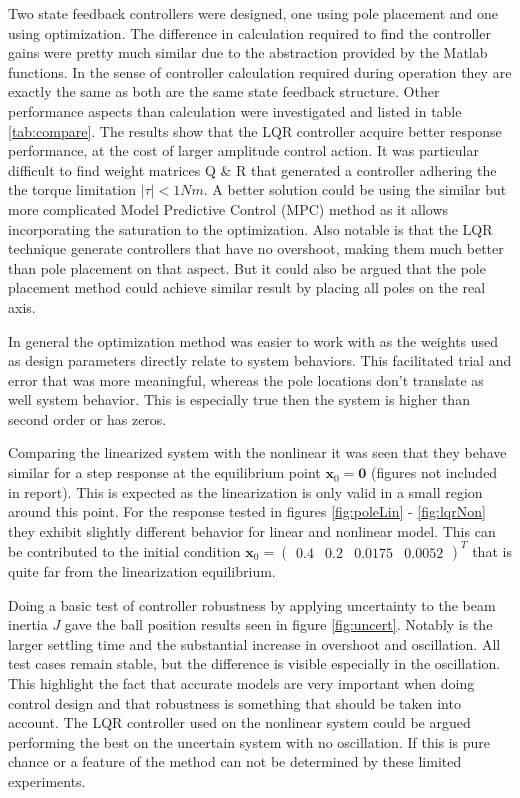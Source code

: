 \documentclass[a4paper, titlepage]{article}
\begin{document}
Two state feedback controllers were designed, one using pole placement and one using optimization.
The difference in calculation required to find the controller gains were pretty much similar due to the abstraction provided by the Matlab functions.
In the sense of controller calculation required during operation they are exactly the same as both are the same state feedback structure.
Other performance aspects than calculation were investigated and listed in table \ref{tab:compare}.
The results show that the LQR controller acquire better response performance, at the cost of larger amplitude control action.
It was particular difficult to find weight matrices Q \& R that generated a controller adhering the the torque limitation $|\tau| < 1Nm$.
A better solution could be using the similar but more complicated Model Predictive Control (MPC) method as it allows incorporating the saturation to the optimization.
Also notable is that the LQR technique generate controllers that have no overshoot, making them much better than pole placement on that aspect.
But it could also be argued that the pole placement method could achieve similar result by placing all poles on the real axis.

In general the optimization method was easier to work with as the weights used as design parameters directly relate to system behaviors.
This facilitated trial and error that was more meaningful, whereas the pole locations don't translate as well system behavior.
This is especially true then the system is higher than second order or has zeros.

Comparing the linearized system with the nonlinear it was seen that they behave similar for a step response at the equilibrium point $\textbf{x}_0 = \textbf{0}$ (figures not included in report).
This is expected as the linearization is only valid in a small region around this point.
For the response tested in figures \ref{fig:poleLin} - \ref{fig:lqrNon} they exhibit slightly different behavior for linear and nonlinear model.
This can be contributed to the initial condition $\textbf{x}_0 = \begin{pmatrix} 0.4 & 0.2 & 0.0175 & 0.0052 \end{pmatrix}^T$ that is quite far from the linearization equilibrium.

Doing a basic test of controller robustness by applying uncertainty to the beam inertia $J$ gave the ball position results seen in figure \ref{fig:uncert}.
Notably is the larger settling time and the substantial increase in overshoot and oscillation.
All test cases remain stable, but the difference is visible especially in the oscillation.
This highlight the fact that accurate models are very important when doing control design and that robustness is something that should be taken into account.
The LQR controller used on the nonlinear system could be argued performing the best on the uncertain system with no oscillation.
If this is pure chance or a feature of the method can not be determined by these limited experiments.
\end{document}
